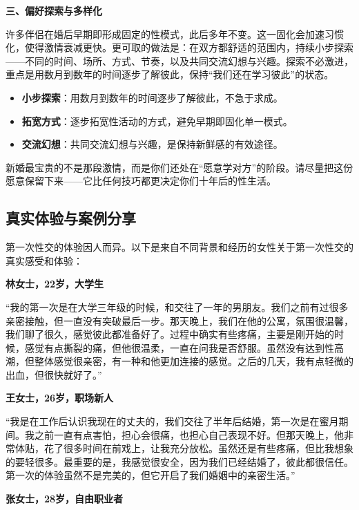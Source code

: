 \documentclass[12pt,UTF8]{ctexbook}
\begin{document}
\textbf{三、偏好探索与多样化}

许多伴侣在婚后早期即形成固定的性模式，此后多年不变。这一固化会加速习惯化，使得激情衰减更快。更可取的做法是：在双方都舒适的范围内，持续小步探索——不同的时间、场所、方式、节奏，以及共同交流幻想与兴趣。探索不必激进，重点是用数月到数年的时间逐步了解彼此，保持“我们还在学习彼此”的状态。

\begin{itemize}
\item \textbf{小步探索}：用数月到数年的时间逐步了解彼此，不急于求成。
\item \textbf{拓宽方式}：逐步拓宽性活动的方式，避免早期即固化单一模式。
\item \textbf{交流幻想}：共同交流幻想与兴趣，是保持新鲜感的有效途径。
\end{itemize}

\begin{tcolorbox}[colback=pink!5!white,colframe=red!50!black,title=贴心小叮咛]
新婚最宝贵的不是那段激情，而是你们还处在“愿意学对方”的阶段。请尽量把这份愿意保留下来——它比任何技巧都更决定你们十年后的性生活。
\end{tcolorbox}

\subsection{真实体验与案例分享}

第一次性交的体验因人而异。以下是来自不同背景和经历的女性关于第一次性交的真实感受和体验：

\textbf{林女士，22岁，大学生}

“我的第一次是在大学三年级的时候，和交往了一年的男朋友。我们之前有过很多亲密接触，但一直没有突破最后一步。那天晚上，我们在他的公寓，氛围很温馨，我们聊了很久，感觉彼此都准备好了。过程中确实有些疼痛，主要是刚开始的时候，感觉有点撕裂的痛，但他很温柔，一直在问我是否舒服。虽然没有达到性高潮，但整体感觉很亲密，有一种和他更加连接的感觉。之后的几天，我有点轻微的出血，但很快就好了。”

\textbf{王女士，26岁，职场新人}

“我是在工作后认识我现在的丈夫的，我们交往了半年后结婚，第一次是在蜜月期间。我之前一直有点害怕，担心会很痛，也担心自己表现不好。但那天晚上，他非常体贴，花了很多时间在前戏上，让我充分放松。虽然还是有些疼痛，但比我想象的要轻很多。最重要的是，我感觉很安全，因为我们已经结婚了，彼此都很信任。第一次的体验虽然不是完美的，但它开启了我们婚姻中的亲密生活。”

\textbf{张女士，28岁，自由职业者}
\end{document}
